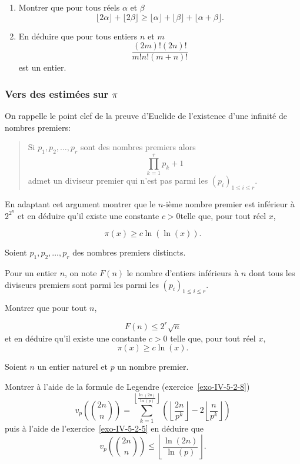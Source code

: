 \begin{exo}
    \begin{enumerate}
        \item Montrer que pour tous réels $\alpha$ et $\beta$
              \[\lfloor 2 \alpha \rfloor  + \lfloor  2\beta\rfloor \geq \lfloor \alpha \rfloor + \lfloor \beta \rfloor + \lfloor \alpha + \beta \rfloor. \]
        \item En déduire que pour tous entiers $n$ et $m$
              \[ \frac{(2m)! (2n)!}{m! n! (m+n)!}\]
              est un entier.
    \end{enumerate}
\end{exo}

\subsubsection{Vers des estimées sur $\pi$}

\begin{exo}
    On rappelle le point clef de la preuve d'Euclide de l'existence d'une infinité de nombres premiers:
    \begin{quote}
        Si $p_1, p_2, \ldots, p_r$ sont des nombres premiers alors
        \[\prod_{k=1}^r p_k +1\]
        admet un diviseur premier qui n'est pas parmi les $(p_i)_{1 \leq i \leq r}$.


    \end{quote}
    En adaptant cet argument montrer que le $n$-ième nombre premier est inférieur à $2^{2^n}$ et en déduire qu'il existe une constante $c>0$telle que, pour tout réel $x$,

    \[\pi(x) \geq c \ln(\ln(x)).\]
\end{exo}


\begin{exo}
    Soient $p_1, p_2, \ldots, p_r$ des nombres premiers distincts.

    Pour un entier $n$, on note $F(n)$ le nombre d'entiers inférieurs à $n$ dont tous les diviseurs premiers sont parmi les parmi les $(p_i)_{1 \leq i \leq r}$.

    Montrer que pour tout $n$,

    \[F(n) \leq 2^r \sqrt{n}\]
    et en déduire qu'il existe une constante $c>0$ telle que, pour tout réel $x$,
    \[\pi(x) \geq c \ln(x).\]
\end{exo}

\begin{exo}
    Soient $n$ un entier naturel et $p$ un nombre premier.

    Montrer à l'aide de la formule de Legendre (exercice~\ref{exo-IV-5-2-8})
    \[v_p\left( \binom{2n}{n}\right) = \sum_{k=1}^{\left\lfloor \frac{\ln(2n)}{\ln(p)} \right\rfloor} \left(\left\lfloor \frac{2n}{p^k} \right\rfloor - 2 \left\lfloor \frac{n}{p^k} \right\rfloor  \right)\]
    puis à l'aide de l'exercice~\ref{exo-IV-5-2-5} en déduire que
    \[v_p\left( \binom{2n}{n}\right) \leq \left\lfloor \frac{\ln(2n)}{\ln(p)} \right\rfloor.\]
\end{exo}

